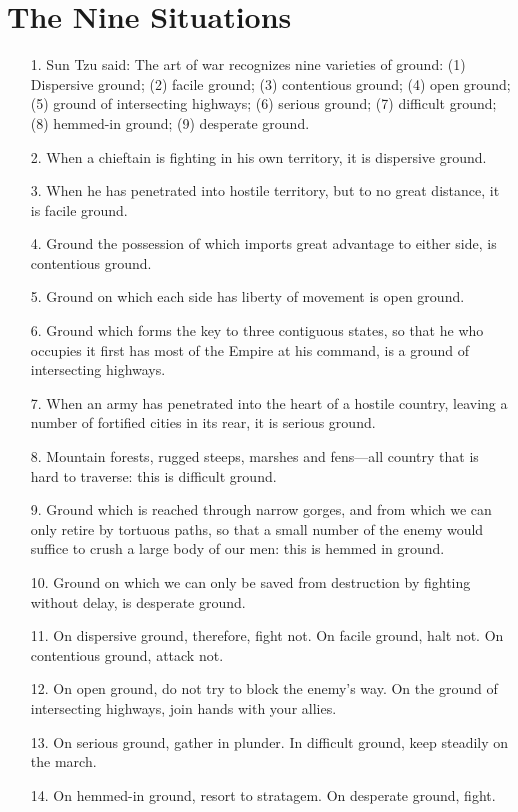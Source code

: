 \documentclass[11pt,openany]{memoir}
\newcommand{\enumeratemargin}{1.30em}
\begin{document}
\chapter{The Nine Situations}
\begin{enumerate}[leftmargin=\enumeratemargin]
\item[1.] Sun Tzu said: The art of war recognizes nine varieties of ground: (1) Dispersive ground; (2) facile ground; (3) contentious ground; (4) open ground; (5) ground of intersecting highways; (6) serious ground; (7) difficult ground; (8) hemmed-in ground; (9) desperate ground.
\item[2.] When a chieftain is fighting in his own territory, it is dispersive ground.
\item[3.] When he has penetrated into hostile territory, but to no great distance, it is facile ground.
\item[4.] Ground the possession of which imports great advantage to either side, is contentious ground.
\item[5.] Ground on which each side has liberty of movement is open ground.
\item[6.] Ground which forms the key to three contiguous states, so that he who occupies it first has most of the Empire at his command, is a ground of intersecting highways.
\item[7.] When an army has penetrated into the heart of a hostile country, leaving a number of fortified cities in its rear, it is serious ground.
\item[8.] Mountain forests, rugged steeps, marshes and fens---all country that is hard to traverse: this is difficult ground.
\item[9.] Ground which is reached through narrow gorges, and from which we can only retire by tortuous paths, so that a small number of the enemy would suffice to crush a large body of our men: this is hemmed in ground.
\item[10.] Ground on which we can only be saved from destruction by fighting without delay, is desperate ground.
\item[11.] On dispersive ground, therefore, fight not. On facile ground, halt not. On contentious ground, attack not.
\item[12.] On open ground, do not try to block the enemy's way. On the ground of intersecting highways, join hands with your allies.
\item[13.] On serious ground, gather in plunder. In difficult ground, keep steadily on the march.
\item[14.] On hemmed-in ground, resort to stratagem. On desperate ground, fight.

\end{enumerate}
\end{document}
